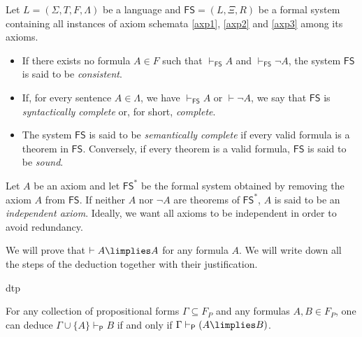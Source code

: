 \begin{definition}
Let $L = (\Sigma,T,F, \Lambda)$ be a language and $\mathsf{FS} = (L,\Xi,R)$ be a formal system containing all instances of axiom schemata \ref{axp1}, \ref{axp2} and \ref{axp3} among its axioms.
\begin{itemize}
\item If there exists no formula $A \in F$ such that $\vdash_\mathsf{FS} A $ and $\vdash_\mathsf{FS} \lnot A$, the system $\mathsf{FS}$ is said to be \emph{consistent}.
\item If, for every sentence $A\in \Lambda$, we have $\vdash_\mathsf{FS} A$ or $\vdash \lnot A$, we say that $\mathsf{FS}$ is \emph{syntactically complete} or, for short, \emph{complete}.
\item The system $\mathsf{FS}$ is said to be \emph{semantically complete} if every valid formula is a theorem in $\mathsf{FS}$. Conversely, if every theorem is a valid formula, $\mathsf{FS}$ is said to be \emph{sound}.
\end{itemize}
Let $A$ be an axiom and let $\mathsf{FS}^*$ be the formal system obtained by removing the axiom $A$ from $\mathsf{FS}$. If neither $A$ nor $\lnot A$ are theorems of $\mathsf{FS}^*$, $A$ is said to be an \emph{independent axiom}. Ideally, we want all axioms to be independent in order to avoid redundancy.
\end{definition}


\begin{example} \label{dedaa}
We will prove that $\vdash A \limplies A$ for any formula $A$. We will write down all the steps of the deduction together with their justification.

\begin{deduction}{dtp}
\end{deduction}
\end{example}


\begin{theorem}
\label{dedthmprop}
For any collection of propositional forms $\Gamma\subseteq F_P$ and any formulas $A,B\in F_P$, one can deduce $\Gamma\cup\{A\}\vdash_{\mathsf{P}} B$ if and only if $\Gamma \vdash_\mathsf{P} (A\limplies B)$. 
\label{}
\end{theorem}

